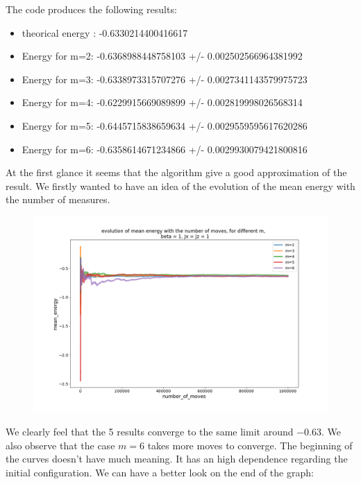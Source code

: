 \documentclass[a4paper,12pt,twoside]{article}
\begin{document}
	 The code produces the following results:
	 \begin{itemize}[label=$\star$]
	 	\item theorical energy : -0.6330214400416617
	 	\item Energy for m=2: -0.6368988448758103 +/- 0.002502566964381992
	 	\item Energy for m=3: -0.6338973315707276 +/- 0.0027341143579975723
	 	\item Energy for m=4: -0.6229915669089899 +/- 0.002819998026568314
	 	\item Energy for m=5: -0.6445715838659634 +/- 0.0029559595617620286
	 	\item Energy for m=6: -0.6358614671234866 +/- 0.0029930079421800816
	 \end{itemize}
	 
	 At the first glance it seems that the algorithm give a good approximation of the result. We firstly wanted to have an idea of the evolution of the mean energy with the number of measures.
	 \begin{figure}[!h]
	 	\centering
	 	\includegraphics[scale=0.4]{meanenrgyevolution_x=z=1_m2-6.png}
	 	\label{energy mean evolution}			
	 \end{figure}
	 
	 We clearly feel that the 5 results converge to the same limit around $-0.63$. We also observe that the case $m = 6$ takes more moves to converge.
	 The beginning of the curves doesn't have much meaning. It has an high dependence regarding the initial configuration.
	 We can have a better look on the end of the graph:
	 
\end{document}
